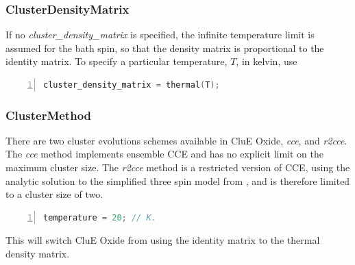 \documentclass{book}
\begin{document}
\subsubsection{ClusterDensityMatrix} %
If no \textit{cluster\_density\_matrix} is specified, the infinite temperature
limit is assumed for the bath spin, so that the density matrix is proportional
to the identity matrix.  To specify a particular temperature, $T$, in kelvin, 
use
\begin{lstlisting}[frame=single,numbers=left,language=c]
cluster_density_matrix = thermal(T);
\end{lstlisting}

\subsubsection{ClusterMethod} %
There are two cluster evolutions schemes available in CluE Oxide, 
\textit{cce}, and \textit{r2cce}.
The \textit{cce} method implements ensemble CCE
\cite{2008_Yang_Liu,2009_Yang_Liu} and has no explicit limit on the maximum
cluster size.  
The \textit{r2cce} method is a restricted version of CCE, 
using the analytic solution to the simplified three spin model from
\cite{2006_Witzel_DasSarma}, and is therefore limited to a cluster size of two.

\begin{lstlisting}[frame=single,numbers=left,language=c]
temperature = 20; // K.
\end{lstlisting}
This will switch CluE Oxide from using the identity matrix to the thermal 
density matrix. 
\end{document}
